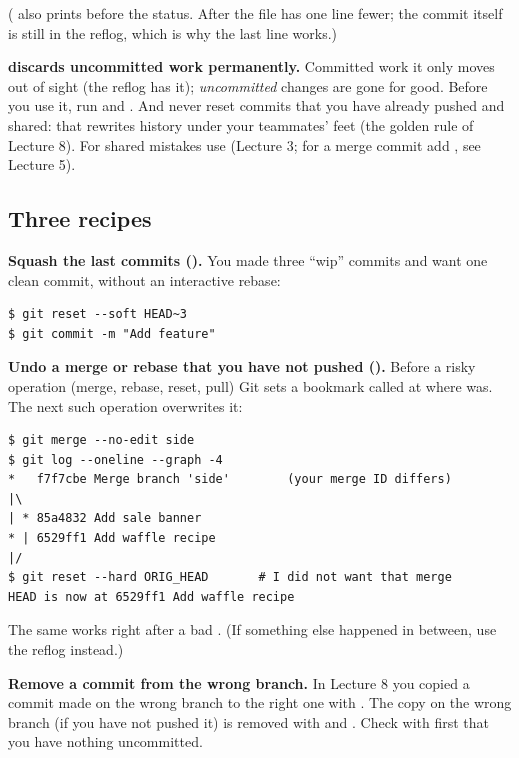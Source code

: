 ( also prints  before the status. After  the file has one line fewer; the commit itself is still in the reflog, which is why the last line works.)

\begin{pitfall}
\textbf{ discards uncommitted work permanently.} Committed work it only moves out of sight (the reflog has it); \emph{uncommitted} changes are gone for good. Before you use it, run  and . And never reset commits that you have already pushed and shared: that rewrites history under your teammates' feet (the golden rule of Lecture 8). For shared mistakes use  (Lecture 3; for a merge commit add , see Lecture 5).
\end{pitfall}

\subsection{Three recipes}

\textbf{Squash the last commits ().} You made three ``wip'' commits and want one clean commit, without an interactive rebase:

\begin{lstlisting}
$ git reset --soft HEAD~3
$ git commit -m "Add feature"
\end{lstlisting}

\textbf{Undo a merge or rebase that you have not pushed ().} Before a risky operation (merge, rebase, reset, pull) Git sets a bookmark called  at where  was. The next such operation overwrites it:

\begin{lstlisting}
$ git merge --no-edit side
$ git log --oneline --graph -4
*   f7f7cbe Merge branch 'side'        (your merge ID differs)
|\
| * 85a4832 Add sale banner
* | 6529ff1 Add waffle recipe
|/
$ git reset --hard ORIG_HEAD       # I did not want that merge
HEAD is now at 6529ff1 Add waffle recipe
\end{lstlisting}

The same works right after a bad . (If something else happened in between, use the reflog instead.)

\textbf{Remove a commit from the wrong branch.} In Lecture 8 you copied a commit made on the wrong branch to the right one with . The copy on the wrong branch (if you have not pushed it) is removed with  and . Check with  first that you have nothing uncommitted.

